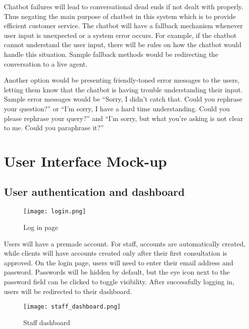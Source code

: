 \begin{itemize}
	\subitem Chatbot failures will lead to conversational dead ends if not dealt with properly. Thus negating the main purpose of chatbot in this system which is to provide efficient customer service. The chatbot will have a fallback mechanism whenever user input is unexpected or a system error occurs. For example, if the chatbot cannot understand the user input, there will be rules on how the chatbot would handle this situation. Sample fallback methods would be redirecting the conversation to a live agent. 
	
	\subitem Another option would be presenting friendly-toned error messages to the users, letting them know that the chatbot is having trouble understanding their input. Sample error messages would be “Sorry, I didn't catch that. Could you rephrase your question?” or “I'm sorry, I have a hard time understanding. Could you please rephrase your query?” and “I'm sorry, but what you're asking is not clear to me. Could you paraphrase it?”
	
\end{itemize}


\section{User Interface Mock-up}

\subsection{User authentication and dashboard}

\begin{figure}[h]
	\centering 
	\texttt{[image: login.png]}
	\caption{Log in page}
	\label{fig:login}
\end{figure}

Users will have a premade account. For staff, accounts are automatically created, while clients will have accounts created only after their first consultation is approved. On the login page, users will need to enter their email address and password. Passwords will be hidden by default, but the eye icon next to the password field can be clicked to toggle visibility. After successfully logging in, users will be redirected to their dashboard.

\begin{figure}[h]
	\centering 
	\texttt{[image: staff\_dashboard.png]}
	\caption{Staff dashboard}
	\label{fig:staff_dashboard}
\end{figure}

